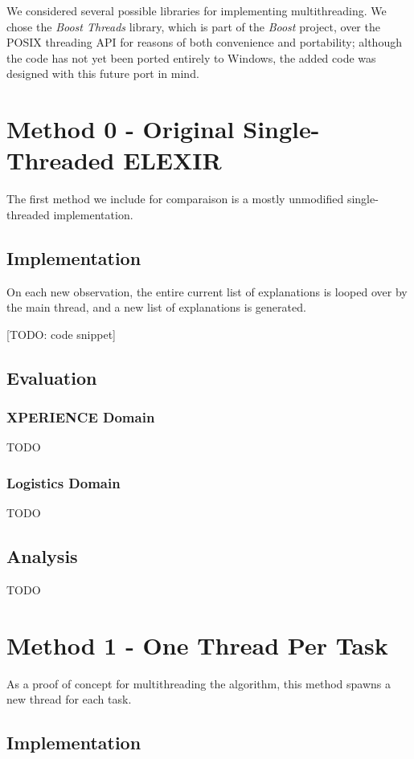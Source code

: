 \documentclass[12pt,twoside,abbrevs,msc,ai,notimes,logo,sansheadings]{infthesis}
\begin{document}
  We considered several possible libraries for implementing multithreading. We chose the \emph{Boost Threads} library, which is part of the \emph{Boost} project, over the POSIX threading API for reasons of both convenience and portability; although the code has not yet been ported entirely to Windows, the added code was designed with this future port in mind.
  
  \chapter {Method 0 - Original Single-Threaded ELEXIR}
  
  The first method we include for comparaison is a mostly unmodified single-threaded implementation.
  
  \section {Implementation}
  
  On each new observation, the entire current list of explanations is looped over by the main thread, and a new list of explanations is generated.
  
  [TODO: code snippet]
  
  \section{Evaluation}
  \subsection{XPERIENCE Domain}
  TODO
  \subsection{Logistics Domain}
  TODO
  \section{Analysis}
  TODO
  
  \chapter {Method 1 - One Thread Per Task}
  
  As a proof of concept for multithreading the algorithm, this method spawns a new thread for each task.
  
  \section {Implementation}
  
\end{document}
